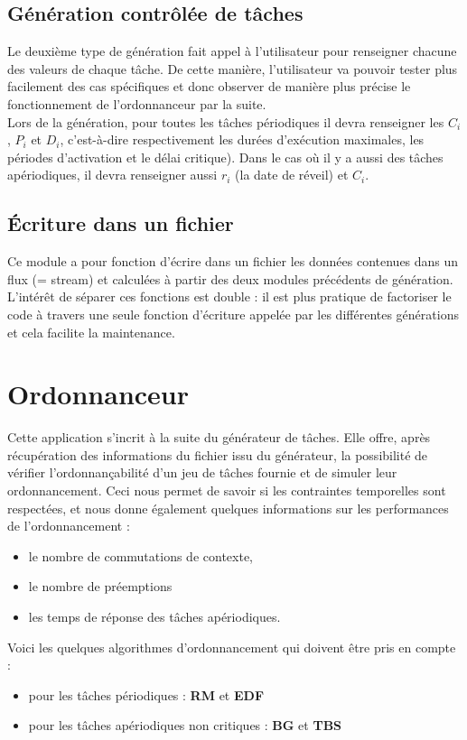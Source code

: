 			\subsection{Génération contrôlée de tâches}
				Le deuxième type de génération fait appel à l'utilisateur pour renseigner chacune des valeurs de chaque tâche. De cette manière, l'utilisateur va pouvoir tester plus facilement des cas spécifiques et donc observer de manière plus précise le fonctionnement de l'ordonnanceur par la suite. \\
				Lors de la génération, pour toutes les tâches périodiques il devra renseigner les $C_i$, $P_i$ et $D_i$, c'est-à-dire respectivement les durées d'exécution maximales, les périodes d'activation et le délai critique). Dans le cas où il y a aussi des tâches apériodiques, il devra renseigner aussi $r_i$ (la date de réveil) et $C_i$.

			\subsection{Écriture dans un fichier}
				Ce module a pour fonction d’écrire dans un fichier les données contenues dans un flux (= stream)  et calculées à partir des deux modules précédents de génération. L’intérêt de séparer ces fonctions est double : il est plus pratique de factoriser le code à travers une seule fonction d’écriture appelée par les différentes générations et cela facilite la maintenance.
	
	\section{Ordonnanceur}
		Cette application s'incrit à la suite du générateur de tâches. Elle offre, après récupération des informations du fichier issu du générateur, la possibilité de vérifier l'ordonnançabilité d'un jeu de tâches fournie et de simuler leur ordonnancement. Ceci nous permet de savoir si les contraintes temporelles sont respectées, et nous donne également quelques informations sur les performances de l'ordonnancement :
		\begin{itemize}
			\item le nombre de commutations de contexte,
			\item le nombre de préemptions
			\item les temps de réponse des tâches apériodiques.
		\end{itemize}

		Voici les quelques algorithmes d'ordonnancement qui doivent être pris en compte :
		\begin{itemize}
			\item pour les tâches périodiques : \textbf{RM} et \textbf{EDF}
			\item pour les tâches apériodiques non critiques :  \textbf{BG} et \textbf{TBS}
		\end{itemize}
	
